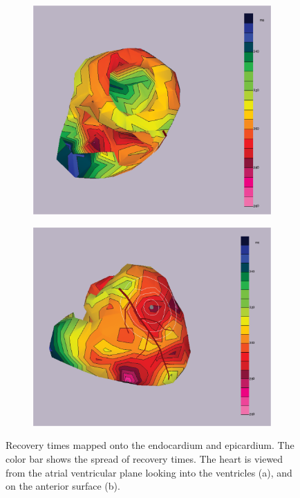 \documentclass[12pt]{article}
\begin{document}
\begin{figure}[H]
	\begin{subfigure}{.5\textwidth}
		\centering
		\includegraphics[width=.95\linewidth]{Figures/1_2_recTimes_1.png}
		\caption{}
		
	\end{subfigure}%
	\begin{subfigure}{.5\textwidth}
		\centering
		\includegraphics[width=.95\linewidth]{Figures/1_2_recTimes_2.png}
		\caption{}
		
	\end{subfigure}
	\caption{Recovery times mapped onto the endocardium and epicardium. The color bar shows the spread of recovery times. The heart is viewed from the atrial ventricular plane looking into the ventricles (a), and on the anterior surface (b).}
	\label{1_2_recTimes}
\end{figure}
\end{document}
